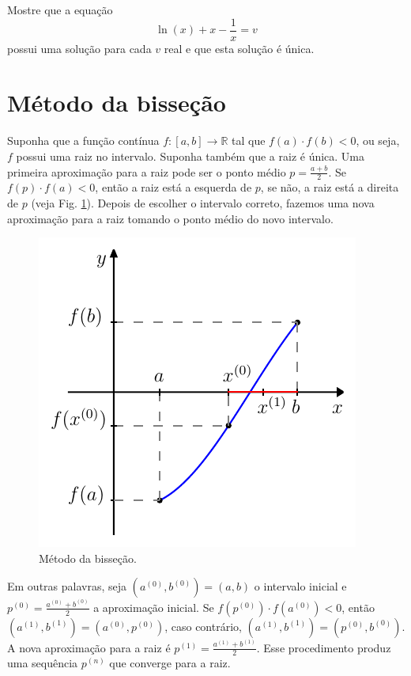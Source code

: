 \documentclass[main.tex]{subfiles}
\begin{document}
\begin{Exercise}\label{existe_unica} Mostre que a equação
  \begin{equation*}
    \ln(x)+x-\frac{1}{x}=v
  \end{equation*}
possui uma solução para cada $v$ real e que esta solução é única.
\end{Exercise}


\section{Método da bisseção}

Suponha que a função contínua $f:[a,b]\to\mathbb{R}$ tal que $f(a)\cdot f(b)<0$, ou seja, $f$ possui uma raiz no intervalo. Suponha também que a raiz é única. Uma primeira aproximação para a raiz pode ser o ponto médio $p=\frac{a+b}{2}$. Se $f(p)\cdot f(a)<0$, então a raiz está a esquerda de $p$, se não, a raiz está a direita de $p$ (veja Fig. \ref{fig:bisection_scheme}). Depois de escolher o intervalo correto, fazemos uma nova aproximação para a raiz tomando o ponto médio do novo intervalo.

\begin{figure}[ht]
  \centering
  \includegraphics[scale=0.5]{./cap_equacao1d/pics/metodo_da_bissecao/metodo_da_bissecao}
  \caption{Método da bisseção.}
  \label{fig:bisection_scheme}
\end{figure}

Em outras palavras, seja $(a^{(0)},b^{(0)})=(a,b)$ o intervalo inicial e $p^{(0)}=\frac{a^{(0)}+b^{(0)}}{2}$ a aproximação inicial. Se $f(p^{(0)})\cdot f(a^{(0)})<0$, então $(a^{(1)},b^{(1)})=(a^{(0)},p^{(0)})$, caso contrário, $(a^{(1)},b^{(1)})=(p^{(0)},b^{(0)})$. A nova aproximação para a raiz é $p^{(1)}=\frac{a^{(1)}+b^{(1)}}{2}$. Esse procedimento produz uma sequência $p^{(n)}$ que converge para a raiz.
\end{document}
